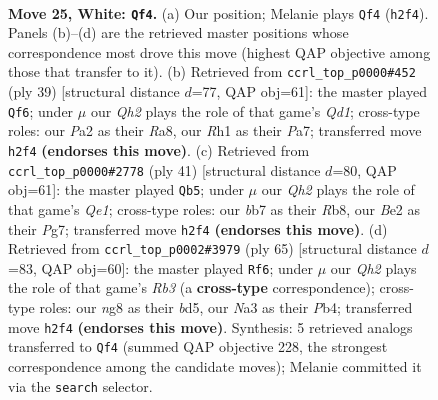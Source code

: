 \documentclass[11pt]{article}
\begin{document}
\clearpage

\begin{figure}[p]\centering
\begin{subfigure}{0.46\textwidth}\centering
\resizebox{\linewidth}{!}{%
\newchessgame
\chessboard[
  setfen={r2k2nr/1b2q3/8/p1p1Pp2/3p3p/NP5P/P3B1PQ/2R3KR w - - 1 25},
  showmover=false,
  pgfstyle=straightmove, color=movearrow, markmove={h2-f4}
]}
\caption{}
\end{subfigure}\hfill
\begin{subfigure}{0.46\textwidth}\centering
\resizebox{\linewidth}{!}{%
\newchessgame
\chessboard[
  setfen={r2q1rk1/pp6/3pp3/2p1b1p1/P3P3/5P2/1PP1KP2/R1BQR3 b - - 1 20},
  showmover=false,
  pgfstyle=straightmove, color=movearrow, markmove={d8-f6}
]}
\caption{}
\end{subfigure}
\\[4pt]
\begin{subfigure}{0.46\textwidth}\centering
\resizebox{\linewidth}{!}{%
\newchessgame
\chessboard[
  setfen={1r2qrk1/5ppp/3p4/3Bp1b1/1P2P3/1Q6/5PPP/1R2K2R b K - 0 21},
  showmover=false,
  pgfstyle=straightmove, color=movearrow, markmove={e8-b5}
]}
\caption{}
\end{subfigure}\hfill
\begin{subfigure}{0.46\textwidth}\centering
\resizebox{\linewidth}{!}{%
\newchessgame
\chessboard[
  setfen={2b1r3/2q3k1/1r4p1/p1pB4/1pP2P1p/3QP2P/P5R1/3R2K1 b - - 2 33},
  showmover=false,
  pgfstyle=straightmove, color=movearrow, markmove={b6-f6}
]}
\caption{}
\end{subfigure}
\caption{\textbf{Move 25, White: \texttt{Qf4}.} (a) Our position; Melanie plays \texttt{Qf4} (\texttt{h2f4}). Panels (b)--(d) are the retrieved master positions whose correspondence most drove this move (highest QAP objective among those that transfer to it). (b) Retrieved from \texttt{ccrl\_top\_p0000\#452} (ply 39) [structural distance $d$=77, QAP obj=61]: the master played \texttt{Qf6}; under $\mu$ our \emph{Qh2} plays the role of that game's \emph{Qd1}; cross-type roles: our \emph{P}a2 as their \emph{R}a8, our \emph{R}h1 as their \emph{P}a7; transferred move \texttt{h2f4} \textbf{(endorses this move)}. (c) Retrieved from \texttt{ccrl\_top\_p0000\#2778} (ply 41) [structural distance $d$=80, QAP obj=61]: the master played \texttt{Qb5}; under $\mu$ our \emph{Qh2} plays the role of that game's \emph{Qe1}; cross-type roles: our \emph{b}b7 as their \emph{R}b8, our \emph{B}e2 as their \emph{P}g7; transferred move \texttt{h2f4} \textbf{(endorses this move)}. (d) Retrieved from \texttt{ccrl\_top\_p0002\#3979} (ply 65) [structural distance $d$=83, QAP obj=60]: the master played \texttt{Rf6}; under $\mu$ our \emph{Qh2} plays the role of that game's \emph{Rb3} (a \textbf{cross-type} correspondence); cross-type roles: our \emph{n}g8 as their \emph{b}d5, our \emph{N}a3 as their \emph{P}b4; transferred move \texttt{h2f4} \textbf{(endorses this move)}. Synthesis: 5 retrieved analogs transferred to \texttt{Qf4} (summed QAP objective 228, the strongest correspondence among the candidate moves); Melanie committed it via the \texttt{search} selector.}
\label{fig:thought-m48}
\end{figure}
\end{document}
